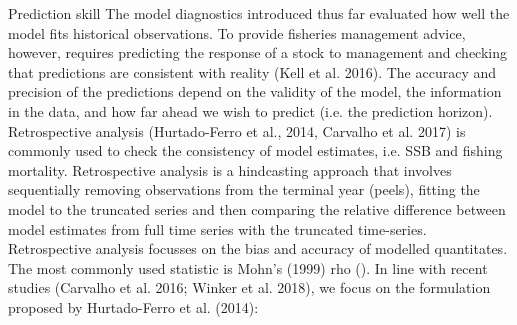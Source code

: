 

\iffalse
Prediction skill
The model diagnostics introduced thus far evaluated how well the model fits historical observations. To provide fisheries management advice, however, requires predicting the response of a stock to management and checking that predictions are consistent with reality (Kell et al. 2016). The accuracy and precision of the predictions depend on the validity of the model, the information in the data, and how far ahead we wish to predict (i.e. the prediction horizon). 
Retrospective analysis  (Hurtado-Ferro et al., 2014, Carvalho et al. 2017) is commonly used to check the consistency of model estimates, i.e. SSB and fishing mortality. Retrospective analysis is a hindcasting approach that involves sequentially removing  observations from the terminal year (peels), fitting the model to the truncated series and then comparing the relative difference between model estimates from full time series with the truncated time-series. Retrospective analysis focusses on the bias and accuracy of modelled quantitates. The most commonly used statistic is Mohn’s (1999) rho (). In line with recent studies (Carvalho et al. 2016; Winker et al. 2018), we focus on the formulation proposed by Hurtado-Ferro et al. (2014): 

